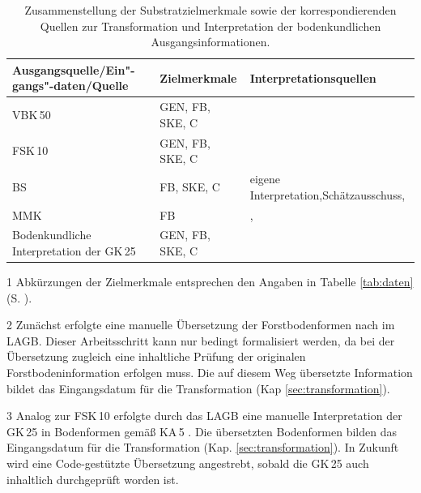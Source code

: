 \begin{table}[t]
  \centering
  \caption{Zusammenstellung der Substratzielmerkmale sowie der korrespondierenden Quellen zur Transformation und Interpretation der bodenkundlichen Ausgangsinformationen.}\label{tab:transformation}
	\vspace*{6pt}
  \begin{threeparttable}
    \begin{tabularx}{\textwidth}{XXX}
    \toprule
    \textbf{Ausgangsquelle/Ein"-gangs"-daten/Quelle} & \textbf{Zielmerkmale}\tnote{1} & \textbf{Interpretationsquellen} \\
    \midrule
    VBK\,50  & GEN, FB, SKE, C & \citet{KA5} \\\midrule
    FSK\,10\tnote{2}  & GEN, FB, SKE, C& \citet{KA5}  \\\midrule
    BS & FB, SKE, C  & eigene Interpretation,\newline  Schätzausschuss, \newline \citet{NBIS2003}\\ \midrule
    MMK  & FB &  \citet{Lieberoth-etal1993,ThiereAltermann1997b,ThiereAltermann1997a,Thiere-etal1991,Thiere-etal1997,Thiere-etal2000}, \\ \midrule
    Bodenkundliche Interpretation der GK\,25\tnote{3} & GEN, FB, SKE, C & \citet{KA5} \\\bottomrule
    \end{tabularx}
\begin{tablenotes}
\footnotesize
    \item[1] Abkürzungen der Zielmerkmale entsprechen den Angaben in Tabelle \ref{tab:daten} (S.  \pageref{tab:daten}).
    \item[2] Zunächst erfolgte eine manuelle Übersetzung der Forstbodenformen nach \citet{KA5} im LAGB. Dieser Arbeitsschritt kann nur bedingt formalisiert werden, da bei der Übersetzung zugleich eine inhaltliche Prüfung der originalen Forstbodeninformation erfolgen muss. Die auf diesem Weg übersetzte Information bildet das Eingangsdatum für die Transformation  (Kap \ref{sec:transformation}).
    \item[3] Analog zur FSK\,10 erfolgte durch das LAGB eine manuelle Interpretation der GK\,25 in Bodenformen gemäß KA\,5 \citep{KA5}. Die übersetzten Bodenformen bilden das Eingangsdatum für die Transformation  (Kap. \ref{sec:transformation}). In Zukunft wird eine Code-gestützte Übersetzung angestrebt, sobald die GK\,25 auch inhaltlich durchgeprüft worden ist.
  \end{tablenotes}
\end{threeparttable}
\end{table}%



